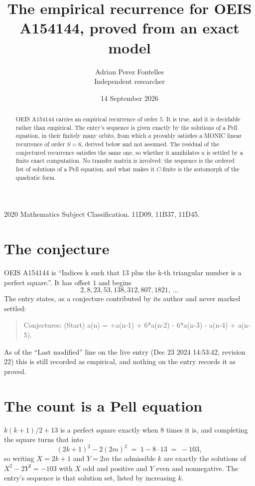 \documentclass[11pt,a4paper]{article}
\title{The empirical recurrence for OEIS A154144, proved from an exact model}
\author{Adrian Perez Fontelles\\ \small Independent researcher}
\date{14 September 2026}
\theoremstyle{plain}
\theoremstyle{definition}
\begin{document}
\maketitle

\begin{abstract}
OEIS A154144 carries an empirical recurrence of order $5$. It is true, and it is
decidable rather than empirical. The entry's sequence is given exactly by the solutions of a Pell equation, in their finitely many orbits, from
which $a$ provably satisfies a MONIC linear recurrence of order $S=6$, derived below and not
assumed. The residual of the conjectured recurrence satisfies the same one, so whether it
annihilates $a$ is settled by a finite exact computation. No transfer matrix is involved: the sequence is the ordered list of solutions of a Pell equation, and what makes it $C$-finite is the automorph of the quadratic form.
\end{abstract}

\noindent\small 2020 Mathematics Subject Classification. 11D09, 11B37, 11D45.\normalsize

\section{The conjecture}

OEIS A154144 is ``Indices k such that 13 plus the k-th triangular number is a perfect square.''. It has offset $1$ and begins
\[
2, 8, 23, 53, 138, 312, 807, 1821,\ \dots
\]
The entry states, as a conjecture contributed by its author and never marked settled:
\begin{quote}
Conjectures: (Start) a(n) = +a(n-1) + 6*a(n-2) - 6*a(n-3) - a(n-4) + a(n-5).
\end{quote}
As of the ``Last modified'' line on the live entry (Dec 23 2024 14:53:42, revision 22)
this is still recorded as empirical, and nothing on the entry records it as proved.

\section{The count is a Pell equation}

$k(k+1)/2 + 13$ is a perfect square exactly when $8$ times it is, and completing the square
turns that into
\[
(2k+1)^2-2(2m)^2\;=\;1-8\cdot13\;=\;-103,
\]
so writing $X=2k+1$ and $Y=2m$ the admissible $k$ are exactly the solutions of $X^2-2Y^2=-103$
with $X$ odd and positive and $Y$ even and nonnegative. The entry's sequence is that solution
set, listed by increasing $k$.
\end{document}
